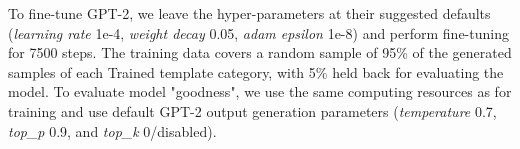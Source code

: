 To fine-tune GPT-2, we leave the hyper-parameters at their suggested defaults (\emph{learning rate} 1e-4, \emph{weight decay} 0.05, \emph{adam epsilon} 1e-8) and perform fine-tuning for 7500 steps.
The training data covers a random sample of 95\% of the generated samples of each Trained template category, with 5\% held back for evaluating the model.
To evaluate model "goodness", we use the same computing resources as for training and use default GPT-2 output generation parameters (\emph{temperature} 0.7, \emph{top\_p} 0.9, and \emph{top\_k} 0/disabled). 
